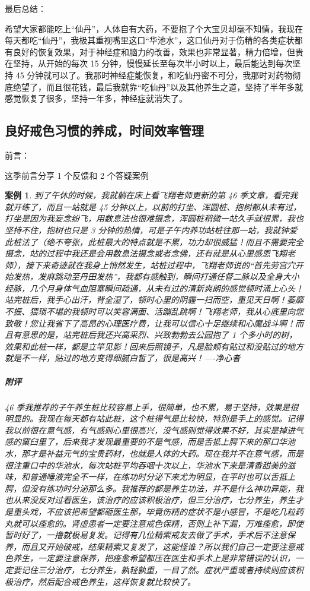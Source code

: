 \documentclass{ctexart}
\newtheorem{case}{案例}
\begin{document}
最后总结：

希望大家都能吃上“仙丹”，人体自有大药，不要抱了个大宝贝却毫不知情，我现在每天都吃“仙丹”，我极其重视嘴里这口“华池水”，这口仙丹对于伤精的各类症状都有良好的恢复效果，对于神经症和脑力的改善，效果也非常显著，精力倍增，但贵在坚持，从开始的每次 15 分钟，慢慢延长至每次半小时以上，最后能达到每次坚持 45 分钟就可以了。我那时神经症能恢复，和吃仙丹密不可分，我那时对药物彻底绝望了，而且很花钱，最后我就靠“吃仙丹”以及其他养生之道，坚持了半年多就感觉恢复了很多，坚持一年多，神经症就消失了。

\subsection{良好戒色习惯的养成，时间效率管理}

前言：

这季前言分享 1 个反馈和 2 个答疑案例

\begin{case}
    到了午休的时候，我就躺在床上看飞翔老师更新的第 46 季文章，看完我就开练了，而且一站就是 45 分钟以上，以前的打坐、浑圆桩、抱树都从未有过，打坐是因为我妄念纷飞，用数息法也很难摄念，浑圆桩稍微一站久手就很累，我也坚持不住，抱树也只是 3 分钟的热情，可是子午内养功站桩往那一站，我就钟爱此桩法了（绝不夸张，此桩最大的特点就是不累，功力却很威猛！而且不需要完全摄念，站的过程中我还是会用数息法摄念或者念佛，还有就是从心里感恩飞翔老师），接下来奇迹就在我身上悄然发生，站桩过程中，飞翔老师说的“首先劳宫穴开始发热，发麻跳动至丹田发热”，我都有感触到，瞬间打通任督二脉以及全身大小经脉，几个月身体气血阻塞瞬间疏通，从未有过的清新爽朗的感觉顿时涌上心头！站完桩后，我手心出汗，背全湿了，顿时心里的阴霾一扫而空，重见天日啊！萎靡不振、猥琐不堪的我顿时可以笑容满面、活蹦乱跳啊！飞翔老师，我从心底里向您致敬！您让我省下了高昂的心理医疗费，让我可以信心十足继续和心魔战斗啊！而且有意思的是，站完桩后我还兴高采烈、兴致勃勃去公园抱了 1 个多小时的树，效果和此桩一样，都是立竿见影！回来后照镜子，凡是脸颊有贴过和没贴过的地方就是不一样，贴过的地方变得细腻白皙了，很是高兴！----净心者
    \subparagraph{附评} 46 季我推荐的子午养生桩比较容易上手，很简单，也不累，易于坚持，效果是很明显的。我现在每天都有站此桩，这个桩得气是比较快，特别是手上的感觉。记得我以前很在意气感，有气感则心里很高兴，没气感则觉得效果不好，其实是掉进气感的窠臼里了，后来我才发现最重要的不是气感，而是舌抵上腭下来的那口华池水，那才是补益元气的宝贵药材，也就是人体的大药。现在我并不在意气感，而是很注重口中的华池水，每次站桩平均吞咽十次以上，华池水下来是清香甜美的滋味，和普通唾液完全不一样，在练功时分泌下来尤为明显，在平时也可以舌抵上腭，但没有练功时分泌那么多。我推荐的都是养生功法，并不是什么神功异能，我也从来没反对过看医生，该治疗的应该积极治疗，但三分治疗，七分养生，养生才是重头戏，不应该把希望都砸医生那，毕竟伤精的症状不是小感冒，不是吃几粒药丸就可以痊愈的。肾虚患者一定要注意戒色保精，否则上补下漏，万难痊愈，即使暂时好了，一撸就极易复发。记得有几位精索戒友去做了手术，手术后不注意保养，而且又开始破戒，结果精索又复发了，这能怪谁？所以我们自己一定要注意戒色养生，一定要注意保养，把痊愈希望都压在医生和手术上是非常错误的认识，一定要记住三分治疗，七分养生，孰轻孰重，一目了然。症状严重或者持续则应该积极治疗，然后配合戒色养生，这样恢复就比较快了。
\end{case}
\end{document}
